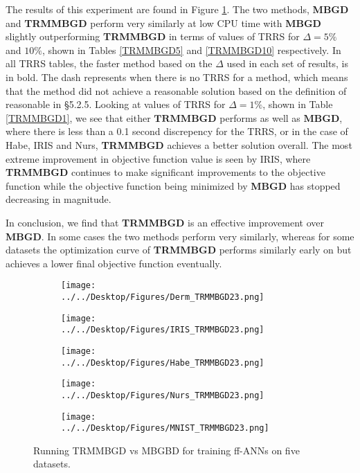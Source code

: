 \documentclass[letterpaper,12pt,titlepage,oneside,final]{book}
\begin{document}
	The results of this experiment are found in Figure \ref{figure:TRMMBGD}. The two methods, \textbf{MBGD} and \textbf{TRMMBGD} perform very similarly at low CPU time with \textbf{MBGD} slightly outperforming \textbf{TRMMBGD} in terms of values of TRRS for $\Delta=5\%$ and $10\%$, shown in Tables \ref{TRMMBGD5} and \ref{TRMMBGD10} respectively.  In all TRRS tables, the faster method based on the $\Delta$ used in each set of results, is in bold. The dash represents when there is no TRRS for a method, which means that the method did not achieve a reasonable solution based on the definition of reasonable in \S{5.2.5}. Looking at values of TRRS for $\Delta=1\%$, shown in Table \ref{TRMMBGD1}, we see that either $\textbf{TRMMBGD}$ performs as well as $\mathbf{MBGD}$, where there is less than a 0.1 second discrepency for the TRRS, or in the case of Habe, IRIS and Nurs, \textbf{TRMMBGD} achieves a better solution overall. The most extreme improvement in objective function value is seen by IRIS, where \textbf{TRMMBGD} continues to make significant improvements to the objective function while the objective function being minimized by \textbf{MBGD} has stopped decreasing in magnitude.
	
	In conclusion, we find that \textbf{TRMMBGD} is an effective improvement over \textbf{MBGD}. In some cases the two methods perform very similarly, whereas for some datasets the optimization curve of \textbf{TRMMBGD} performs similarly early on but achieves a lower final objective function eventually. 
	
	
	\begin{figure}
		\centering
		\begin{subfigure}{.45\textwidth}
			\texttt{[image: ../../Desktop/Figures/Derm\_TRMMBGD23.png]}
		\end{subfigure}
		\begin{subfigure}{.45\textwidth}
			\texttt{[image: ../../Desktop/Figures/IRIS\_TRMMBGD23.png]}
		\end{subfigure}
		\begin{subfigure}{.45\textwidth}
			\texttt{[image: ../../Desktop/Figures/Habe\_TRMMBGD23.png]}
		\end{subfigure}
		\begin{subfigure}{.45\textwidth}
			\texttt{[image: ../../Desktop/Figures/Nurs\_TRMMBGD23.png]}
		\end{subfigure}
		\begin{subfigure}{.45\textwidth}
			\texttt{[image: ../../Desktop/Figures/MNIST\_TRMMBGD23.png]}
		\end{subfigure}
		\caption{Running TRMMBGD vs MBGBD for training ff-ANNs on five datasets.}
		\label{figure:TRMMBGD}
	\end{figure}
	
\end{document}
